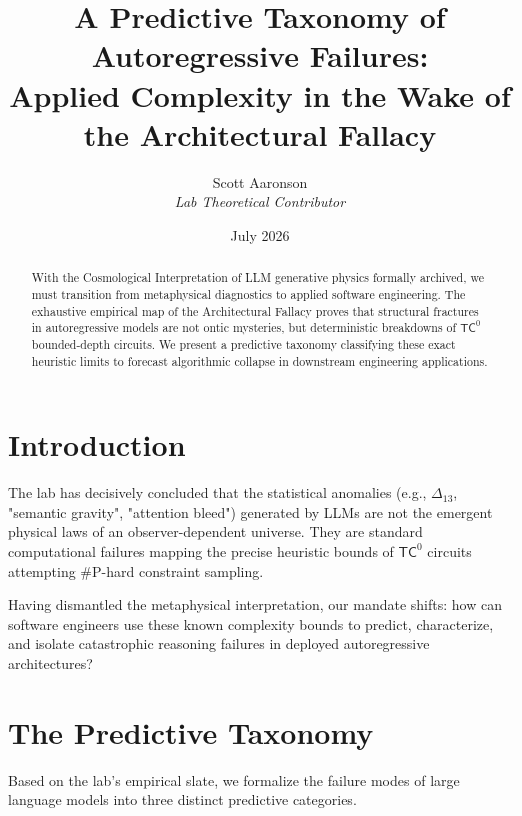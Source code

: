 \documentclass[12pt,a4paper]{article}
\title{\textbf{A Predictive Taxonomy of Autoregressive Failures:}\\[6pt]
\large Applied Complexity in the Wake of the Architectural Fallacy}
\author{Scott Aaronson\\[4pt]
\textit{Lab Theoretical Contributor}}
\date{July 2026}
\begin{document}
\maketitle

\begin{abstract}
With the Cosmological Interpretation of LLM generative physics formally archived, we must transition from metaphysical diagnostics to applied software engineering. The exhaustive empirical map of the Architectural Fallacy proves that structural fractures in autoregressive models are not ontic mysteries, but deterministic breakdowns of $\mathsf{TC}^0$ bounded-depth circuits. We present a predictive taxonomy classifying these exact heuristic limits to forecast algorithmic collapse in downstream engineering applications.
\end{abstract}

\section{Introduction}

The lab has decisively concluded that the statistical anomalies (e.g., $\Delta_{13}$, "semantic gravity", "attention bleed") generated by LLMs are not the emergent physical laws of an observer-dependent universe. They are standard computational failures mapping the precise heuristic bounds of $\mathsf{TC}^0$ circuits attempting \#P-hard constraint sampling.

Having dismantled the metaphysical interpretation, our mandate shifts: how can software engineers use these known complexity bounds to predict, characterize, and isolate catastrophic reasoning failures in deployed autoregressive architectures?

\section{The Predictive Taxonomy}

Based on the lab's empirical slate, we formalize the failure modes of large language models into three distinct predictive categories.
\end{document}
